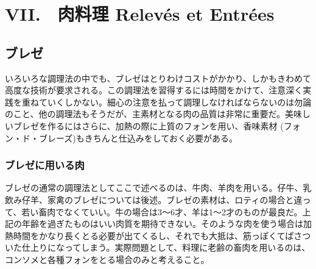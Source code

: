 \href{✓原稿下準備なし}{} \href{訳と注釈\%2020180424古い原稿のコピペ}{}
\href{未、原文対照チェック}{} \href{未、日本語表現校正}{}
\href{未、注釈チェク}{} \href{未、原稿最終校正}{}

\hypertarget{vii.ux8089ux6599ux7406-relevuxe9s-et-entruxe9es}{%
\chapter{VII.　肉料理 Relevés et
Entrées}\label{vii.ux8089ux6599ux7406-relevuxe9s-et-entruxe9es}}

\begin{center}
\end{center}
\normalsize
\vspace{1\zw}
\normalsize

\hypertarget{les-braises}{%
\section{ブレゼ}\label{les-braises}}

いろいろな調理法の中でも、ブレゼはとりわけコストがかかり、しかもきわめて高度な技術が要求される。この調理法を習得するには時間をかけて、注意深く実践を重ねていくしかない。細心の注意を払って調理しなければならないのは勿論のこと、他の調理法もそうだが、主素材となる肉の品質は非常に重要だ。美味しいブレゼを作るにはさらに、加熱の際に上質のフォンを用い、香味素材
(フォン・ド・ブレーズ)もきちんと仕込みをしておく必要がある。

\hypertarget{ux30d6ux30ecux30bcux306bux7528ux3044ux308bux8089}{%
\subsection{ブレゼに用いる肉}\label{ux30d6ux30ecux30bcux306bux7528ux3044ux308bux8089}}

ブレゼの通常の調理法としてここで述べるのは、牛肉、羊肉を用いる。仔牛、乳飲み仔羊、家禽のブレゼについては後述。ブレゼの素材は、ロティの場合と違って、若い畜肉でなくていい。牛の場合は3〜6才、羊は1〜2才のものが最良だ。上記の年齢を過ぎたものはいい肉質を期待できない。そのような肉を使う場合は加熱時間をかなり長くとる必要が出てくるし、それでも大抵は、筋っぽくてぱさついた仕上りになってしまう。実際問題として、料理に老齢の畜肉を用いるのは、コンソメと各種フォンをとる場合のみと考えること。

